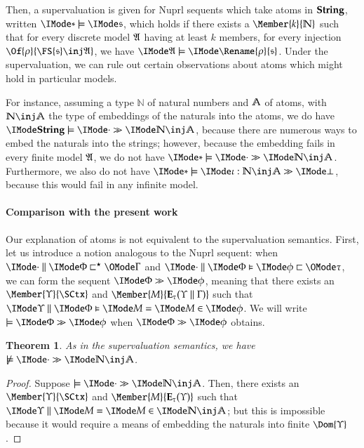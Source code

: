 \documentclass[11pt]{article}
\newtheorem{thm}{Theorem}[section]
\theoremstyle{definition}
\theoremstyle{notation}
\theoremstyle{remark}
\numberwithin{equation}{section}
\newcommand\Exprs{\mathbf{E}}
\newcommand\Naturals{\mathbb{N}}
\begin{document}
Then, a supervaluation is given for Nuprl sequents which take atoms in
$\mathbf{String}$, written $\NuprlInterp{*}{\mathfrak{s}}$, which holds if there
exists a $\Member{k}{\Naturals}$ such that for every discrete model
$\mathfrak{A}$ having at least $k$ members, for every injection
$\Of{\rho}{\FS{\mathfrak{s}} \inj \AtomModel}$, we have
$\NuprlInterp{\AtomModel}{\Rename{\rho}{\mathfrak{s}}}$. Under the
supervaluation, we can rule out certain observations about atoms which might
hold in particular models.

For instance, assuming a type $\Naturals$ of natural numbers and $\mathbb{A}$
of atoms, with $\Naturals\inj\Atoms$ the type of embeddings of the naturals
into the atoms, we do have
$\NuprlInterpSeq{\Strings}{\cdot}{\Naturals\inj\Atoms}$, because there are
numerous ways to embed the naturals into the strings; however, because the
embedding fails in every finite model $\mathfrak{A}$, we do not have
$\NuprlInterpSeq{*}{\cdot}{\Naturals\inj\Atoms}$.  Furthermore, we also do
not have $\NuprlInterpSeq{*}{\iota:\Naturals\inj\Atoms}{\bot}$, because this
would fail in any infinite model.

\paragraph{Comparison with the present work}

Our explanation of atoms is not equivalent to the supervaluation semantics.
First, let us introduce a notion analogous to the Nuprl sequent: when
$\RefinesCtx{\cdot}{\Phi}{\Gamma}$ and $\FRefines{\cdot}{\Phi}{\phi}{\tau}$, we
can form the sequent $\NuprlSeq{\Phi}{\phi}$, meaning that there exists an
$\Member{\Upsilon}{\SCtx}$ and
$\Member{M}{\Exprs_\tau(\Upsilon\parallel\Gamma)}$ such that
$\FRMemEq{\Upsilon}{\Phi}{M}{M}{\phi}$. We will write
$\models\NuprlSeq{\Phi}{\phi}$ when $\NuprlSeq{\Phi}{\phi}$ obtains.

\begin{thm}
  \label{thm:no-nat-injection}
  As in the supervaluation semantics, we have
  $\not\models\NuprlSeq{\cdot}{\Naturals\inj\Atoms}$.
\end{thm}
\begin{proof}
  Suppose $\models\NuprlSeq{\cdot}{\Naturals\inj\Atoms}$. Then, there
  exists an $\Member{\Upsilon}{\SCtx}$ and $\Member{M}{\Exprs_\tau(\Upsilon)}$
  such that $\RMemEq{\Upsilon}{M}{M}{\Naturals\inj\Atoms}$; but this
  is impossible because it would require a means of embedding the naturals into
  finite $\Dom{\Upsilon}$.
\end{proof}
\end{document}
